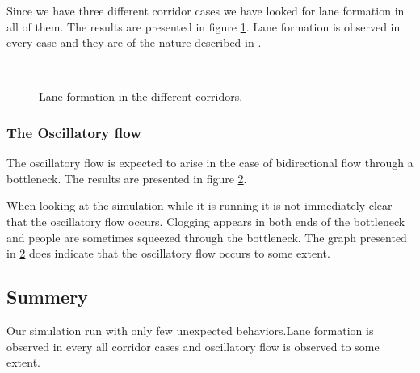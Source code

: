 Since we have three different corridor cases we have looked for lane 
formation in all of them. The results are presented in figure 
\ref{fig:laneformation}. Lane formation is observed in every case 
and they are of the nature described in \cite{self-org}.\\

\begin{figure}[h]
\centering
\subfloat[]{\resizebox{8cm}{!}{}}
\subfloat[]{\resizebox{8cm}{!}{}}\\
\subfloat[]{\resizebox{8cm}{!}{}}
\caption{Lane formation in the different corridors.}
\label{fig:laneformation}
\end{figure}

\subsubsection{The Oscillatory flow}
The oscillatory flow is expected to arise in the case of bidirectional
flow through a bottleneck. The results are presented in figure
\ref{fig:oscillitoryflow}.\\

\begin{figure}[h]
\centering
{}
\caption{}
\label{fig:oscillitoryflow}
\end{figure}

When looking at the simulation while it is running it is not
immediately clear that the oscillatory flow occurs. Clogging
appears in both ends of the bottleneck and people are sometimes
squeezed through the bottleneck. The graph presented in
\ref{fig:oscillitoryflow} does indicate that the oscillatory
flow occurs to some extent.

\subsection{Summery}
Our simulation run with only few unexpected behaviors.Lane formation 
is observed in every all corridor cases and oscillatory flow is 
observed to some extent.